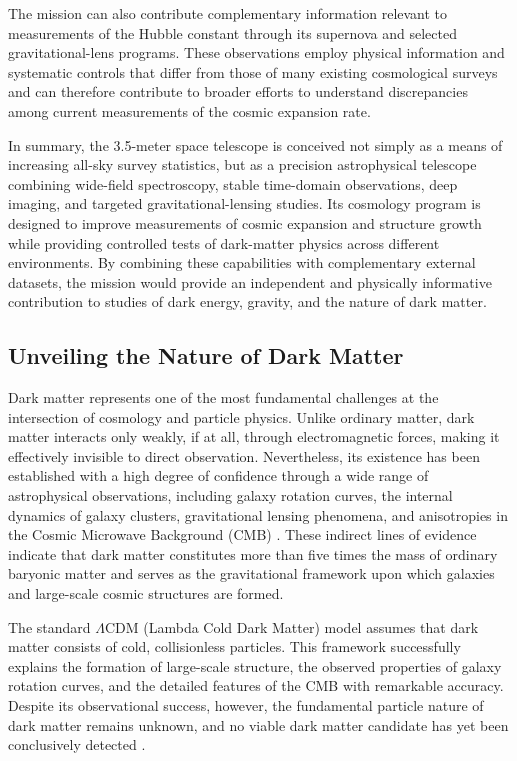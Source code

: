 The mission can also contribute complementary information relevant to measurements of the Hubble constant through its supernova and selected gravitational-lens programs. These observations employ physical information and systematic controls that differ from those of many existing cosmological surveys and can therefore contribute to broader efforts to understand discrepancies among current measurements of the cosmic expansion rate.

In summary, the 3.5-meter space telescope is conceived not simply as a means of increasing all-sky survey statistics, but as a precision astrophysical telescope combining wide-field spectroscopy, stable time-domain observations, deep imaging, and targeted gravitational-lensing studies. Its cosmology program is designed to improve measurements of cosmic expansion and structure growth while providing controlled tests of dark-matter physics across different environments. By combining these capabilities with complementary external datasets, the mission would provide an independent and physically informative contribution to studies of dark energy, gravity, and the nature of dark matter.

\subsection{Unveiling the Nature of Dark Matter}\label{unveiling-the-nature-of-dark-matter}

Dark matter represents one of the most fundamental challenges at the intersection of cosmology and particle physics. Unlike ordinary matter, dark matter interacts only weakly, if at all, through electromagnetic forces, making it effectively invisible to direct observation. Nevertheless, its existence has been established with a high degree of confidence through a wide range of astrophysical observations, including galaxy rotation curves, the internal dynamics of galaxy clusters, gravitational lensing phenomena, and anisotropies in the Cosmic Microwave Background (CMB) \cite{roos2010}. These indirect lines of evidence indicate that dark matter constitutes more than five times the mass of ordinary baryonic matter and serves as the gravitational framework upon which galaxies and large-scale cosmic structures are formed.

The standard $\Lambda$CDM (Lambda Cold Dark Matter) model assumes that dark matter consists of cold, collisionless particles. This framework successfully explains the formation of large-scale structure, the observed properties of galaxy rotation curves, and the detailed features of the CMB with remarkable accuracy. Despite its observational success, however, the fundamental particle nature of dark matter remains unknown, and no viable dark matter candidate has yet been conclusively detected \cite{arbey2021}.

